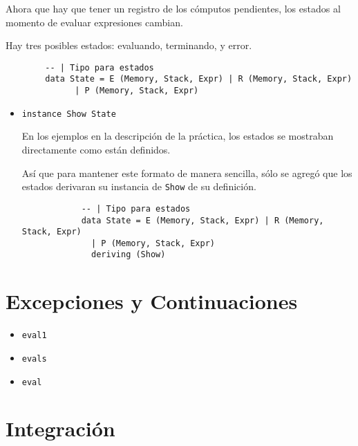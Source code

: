 \documentclass{article}
\newcommand{\tx}[1]{\texttt{#1}}
\begin{document}
    Ahora que hay que tener un registro de los cómputos pendientes, los estados
    al momento de evaluar expresiones cambian.

    Hay tres posibles estados: evaluando, terminando, y error.

    \begin{verbatim}
        -- | Tipo para estados
        data State = E (Memory, Stack, Expr) | R (Memory, Stack, Expr) 
              | P (Memory, Stack, Expr)
    \end{verbatim}

    \begin{itemize}
        \item \tx{instance Show State}

        En los ejemplos en la descripción de la práctica, los estados se
        mostraban directamente como están definidos.

        Así que para mantener este formato de manera sencilla, sólo se agregó 
        que los estados derivaran su instancia de \tx{Show} de su definición.

        \begin{verbatim}
            -- | Tipo para estados
            data State = E (Memory, Stack, Expr) | R (Memory, Stack, Expr) 
              | P (Memory, Stack, Expr)
              deriving (Show)
        \end{verbatim}



    \end{itemize}

    \section{Excepciones y Continuaciones}

    \begin{itemize}
        \item \tx{eval1}
        \item\tx{evals}
        \item \tx{eval}
    \end{itemize}

    \section{Integración}
\end{document}
